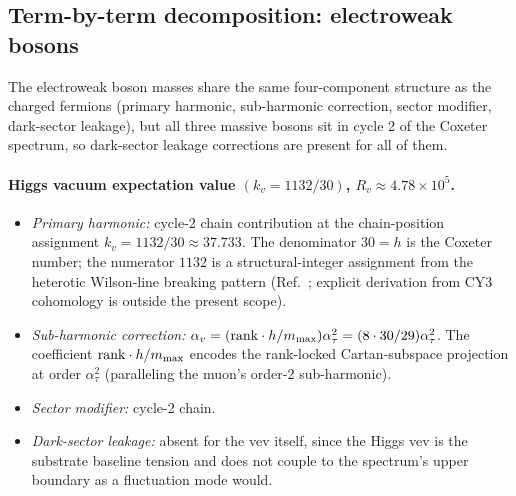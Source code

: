 ﻿\documentclass[reprint,amsmath,amssymb,aps,prd,longbibliography,floatfix]{revtex4-2}
\begin{document}
\subsection{Term-by-term decomposition: electroweak bosons}
\label{sub:boson-terms}

The electroweak boson masses share the same four-component
structure as the charged fermions (primary harmonic, sub-harmonic
correction, sector modifier, dark-sector leakage), but all three
massive bosons sit in cycle 2 of the Coxeter spectrum, so
dark-sector leakage corrections are present for all of them.

\paragraph{Higgs vacuum expectation value $(k_v = 1132/30)$, $R_v \approx 4.78 \times 10^5$.}
\begin{itemize}
\item \emph{Primary harmonic:} cycle-2 chain contribution at the
chain-position assignment $k_v = 1132/30 \approx 37.733$. The
denominator $30 = h$ is the Coxeter number; the numerator $1132$ is
a structural-integer assignment from the heterotic Wilson-line
breaking pattern (Ref.~\cite{BraunHeOvrutPantev2005}; explicit
derivation from CY3 cohomology is outside the present scope).
\item \emph{Sub-harmonic correction:} $\alpha_v = ({\rm rank} \cdot
h/m_{\max}) \alpha_\tau^2 = (8 \cdot 30/29) \alpha_\tau^2$. The
coefficient ${\rm rank} \cdot h/m_{\max}$ encodes the rank-locked
Cartan-subspace projection at order $\alpha_\tau^2$ (paralleling the
muon's order-2 sub-harmonic).
\item \emph{Sector modifier:} cycle-2 chain.
\item \emph{Dark-sector leakage:} absent for the vev itself, since
the Higgs vev is the substrate baseline tension and does not couple
to the spectrum's upper boundary as a fluctuation mode would.
\end{itemize}
\end{document}
